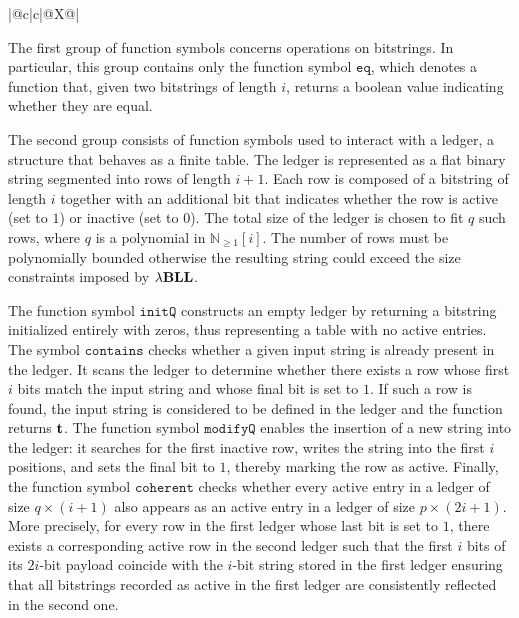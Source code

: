 \begin{footnotesize}
\begin{xltabular}{\textwidth}{|@{\hskip 1.5pt}c|c|@{\hskip 1.5pt}X@{\hskip 1.5pt}|}
\caption{Table of function symbols and their interpretations. We consider ledgers modelled by strings of length $(q\times(i+1))$ and $(p\times(2i+1))$, where $p$ and $q$ are polynomials in $\mathbb{N}_{\geq1}[i]$. This string represents a table with $q$ (resp., $p$) rows, where each row consists of two strings of length $i$ (resp., $2i$) followed by a single bit, which is set to 1 if the corresponding row is active, and 0 otherwise.}
\label{table:new-function-symbols}
\end{xltabular}
\end{footnotesize}

The first group of function symbols concerns operations on bitstrings. In particular, this group contains only the function symbol $\mathtt{eq}$, which denotes a function that, given two bitstrings of length $i$, returns a boolean value indicating whether they are equal.

The second group consists of function symbols used to interact with a ledger, a structure that behaves as a finite table. The ledger is represented as a flat binary string segmented into rows of length $i+1$. Each row is composed of a bitstring of length $i$ together with an additional bit that indicates whether the row is active (set to $1$) or inactive (set to $0$). The total size of the ledger is chosen to fit $q$ such rows, where $q$ is a polynomial in $\mathbb{N}_{\geq 1}[i]$. The number of rows must be polynomially bounded otherwise the resulting string could exceed the size constraints imposed by ${\lambda}\mathbf{BLL}$.

The function symbol $\mathtt{initQ}$ constructs an empty ledger by returning a bitstring initialized entirely with zeros, thus representing a table with no active entries. The symbol $\mathtt{contains}$ checks whether a given input string is already present in the ledger. It scans the ledger to determine whether there exists a row whose first $i$ bits match the input string and whose final bit is set to $1$. If such a row is found, the input string is considered to be defined in the ledger and the function returns $\mathbf{t}$. The function symbol $\mathtt{modifyQ}$ enables the insertion of a new string into the ledger: it searches for the first inactive row, writes the string into the first $i$ positions, and sets the final bit to $1$, thereby marking the row as active. Finally, the function symbol $\mathtt{coherent}$ checks whether every active entry in a ledger of size $q \times (i+1)$ also appears as an active entry in a ledger of size $p \times (2i+1)$. More precisely, for every row in the first ledger whose last bit is set to $1$, there exists a corresponding active row in the second ledger such that the first $i$ bits of its $2i$-bit payload coincide with the $i$-bit string stored in the first ledger ensuring that all bitstrings recorded as active in the first ledger are consistently reflected in the second one.

